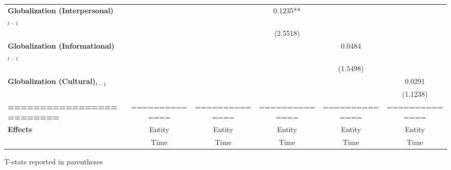 \begin{center}
\begin{tabular}{lccccc}
\textbf{Globalization (Interpersonal)$_{t-1}$}             &                  &                  &     0.1235**     &                  &                   \\
\textbf{ }                         &                  &                  &     (2.5518)     &                  &                   \\
\textbf{Globalization (Informational)$_{t-1}$}             &                  &                  &                  &      0.0484      &                   \\
\textbf{ }                         &                  &                  &                  &     (1.5498)     &                   \\
\textbf{Globalization (Cultural)$_{t-1}$}             &                  &                  &                  &                  &      0.0291       \\
\textbf{ }                         &                  &                  &                  &                  &     (1.1238)      \\
\textbf{=========================} &  ==============  &  ==============  &  ==============  &  ==============  &  ==============   \\
\textbf{Effects}                   &      Entity      &      Entity      &      Entity      &      Entity      &      Entity       \\
\textbf{}                          &       Time       &       Time       &       Time       &       Time       &       Time        \\
\bottomrule
\end{tabular}
\end{center}

T-stats reported in parentheses